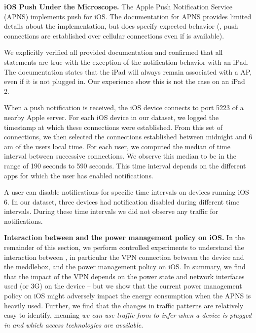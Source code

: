 \noindent \textbf{iOS Push Under the Microscope.} 
The Apple Push Notification Service 
(APNS) implements push for iOS. The documentation for APNS provides limited details about 
the implementation, but does specify expected behavior (\eg, push 
connections are established over cellular connections even if 
\wifi is available). 

We explicitly verified all provided documentation and confirmed that 
all statements are true with the exception of the notification behavior 
with an iPad. The documentation states that the iPad will always 
remain associated with a \wifi AP, even if it is not plugged in. Our 
experience show this is not the case on an iPad 2.

When a push notification is received, the iOS device connects to port
5223 of a nearby Apple server. For each iOS device in our dataset, we
logged the timestamp at which these connections were established. From
this set of connections, we then selected the connections established
between midnight and 6 am of the users local time. For each user, we
computed the median of time interval between successive
connections. We observe this median to be in the range of 190 seconds
to 590 seconds. This time interval depends on the different apps for
which the user has enabled notifications. 

A user can disable notifications for specific time intervals on
devices running iOS 6. In our dataset, three devices had notification
disabled during different time intervals. During these time intervals
we did not observe any traffic for notifications.

\noindent\textbf{Interaction between \meddle and the power management
  policy on iOS.}
In the remainder of this section, we perform controlled experiments 
to understand the interaction between \meddle{}, in particular the VPN
connection between the device and the meddlebox, and the power
management policy on iOS. In summary, we find that the impact of the VPN depends 
on the power state and network interfaces used (\wifi or 3G) on the
device -- but we show that the current power management policy on iOS
might adversely impact the energy consumption when the APNS is heavily used.
Further, we find that the changes in traffic patterns are relatively 
easy to identify, meaning \emph{we can use traffic from \meddle to infer 
when a device is plugged in and which access technologies are 
available}.

